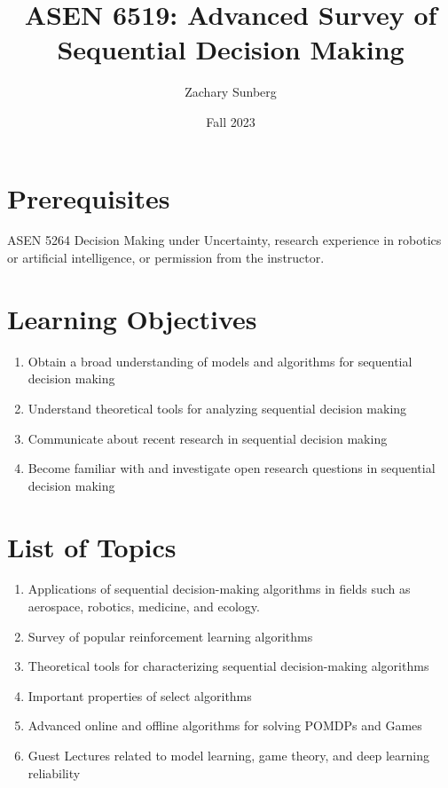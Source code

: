 \documentclass[9pt]{article}
\title{ASEN 6519: Advanced Survey of Sequential Decision Making}
\author{Zachary Sunberg}
\date{Fall 2023}
\begin{document}
\maketitle

\section*{Prerequisites}

ASEN 5264 Decision Making under Uncertainty, research experience in robotics or artificial intelligence, or permission from the instructor.

\section*{Learning Objectives}

\begin{enumerate}[nosep]
    \item Obtain a broad understanding of models and algorithms for sequential decision making
    \item Understand theoretical tools for analyzing sequential decision making
    \item Communicate about recent research in sequential decision making
    \item Become familiar with and investigate open research questions in sequential decision making
\end{enumerate}

\section*{List of Topics}

\begin{enumerate}[nosep]
    \item Applications of sequential decision-making algorithms in fields such as aerospace, robotics, medicine, and ecology.
    \item Survey of popular reinforcement learning algorithms
    \item Theoretical tools for characterizing sequential decision-making algorithms
    \item Important properties of select algorithms
    \item Advanced online and offline algorithms for solving POMDPs and Games
    \item Guest Lectures related to model learning, game theory, and deep learning reliability
\end{enumerate}
\end{document}
